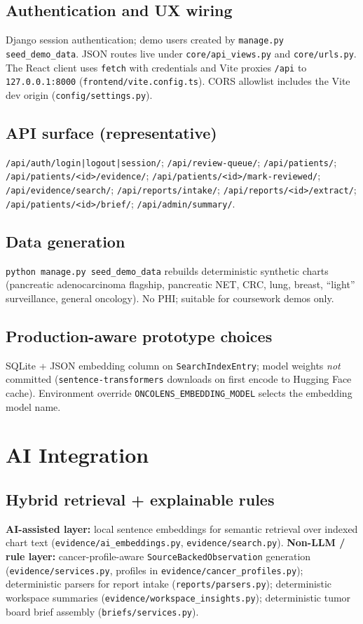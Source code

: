 \documentclass[11pt]{article}
\begin{document}
\subsection{Authentication and UX wiring}
Django session authentication; demo users created by \texttt{manage.py seed\_demo\_data}. JSON routes live under \texttt{core/api\_views.py} and \texttt{core/urls.py}. The React client uses \texttt{fetch} with credentials and Vite proxies \texttt{/api} to \texttt{127.0.0.1:8000} (\texttt{frontend/vite.config.ts}). CORS allowlist includes the Vite dev origin (\texttt{config/settings.py}).

\subsection{API surface (representative)}
\texttt{/api/auth/login|logout|session/}; \texttt{/api/review-queue/}; \texttt{/api/patients/}; \texttt{/api/patients/<id>/evidence/}; \texttt{/api/patients/<id>/mark-reviewed/}; \texttt{/api/evidence/search/}; \texttt{/api/reports/intake/}; \texttt{/api/reports/<id>/extract/}; \texttt{/api/patients/<id>/brief/}; \texttt{/api/admin/summary/}.

\subsection{Data generation}
\texttt{python manage.py seed\_demo\_data} rebuilds deterministic synthetic charts (pancreatic adenocarcinoma flagship, pancreatic NET, CRC, lung, breast, ``light'' surveillance, general oncology). No PHI; suitable for coursework demos only.

\subsection{Production-aware prototype choices}
SQLite + JSON embedding column on \texttt{SearchIndexEntry}; model weights \emph{not} committed (\texttt{sentence-transformers} downloads on first encode to Hugging Face cache). Environment override \texttt{ONCOLENS\_EMBEDDING\_MODEL} selects the embedding model name.

\section{AI Integration}

\subsection{Hybrid retrieval + explainable rules}
\textbf{AI-assisted layer:} local sentence embeddings for semantic retrieval over indexed chart text (\texttt{evidence/ai\_embeddings.py}, \texttt{evidence/search.py}). \textbf{Non-LLM / rule layer:} cancer-profile-aware \texttt{SourceBackedObservation} generation (\texttt{evidence/services.py}, profiles in \texttt{evidence/cancer\_profiles.py}); deterministic parsers for report intake (\texttt{reports/parsers.py}); deterministic workspace summaries (\texttt{evidence/workspace\_insights.py}); deterministic tumor board brief assembly (\texttt{briefs/services.py}).
\end{document}
